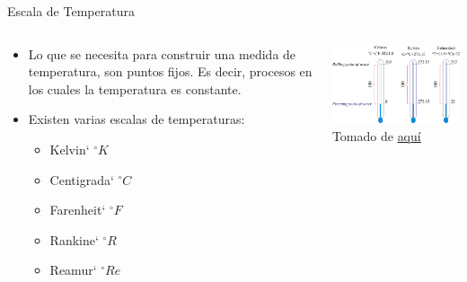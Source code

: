 \documentclass[aspectratio=169]{beamer}
\begin{document}
\begin{frame}{Escala de Temperatura}
    \begin{columns}[c, onlytextwidth]
        \begin{column}{0.50\textwidth}
            \begin{itemize}
                \item Lo que se necesita para construir una medida de temperatura, son puntos fijos. Es decir, procesos en los cuales la temperatura es constante.
                \item Existen varias escalas de temperaturas:
                \begin{itemize}
                    \item Kelvin` $ ^{\circ} K$
                    \item Centigrada` $ ^{\circ} C$
                    \item Farenheit` $ ^{\circ} F$
                    \item Rankine` $ ^{\circ} R$
                    \item Reamur` $ ^{\circ} Re$
                \end{itemize}
            \end{itemize}
        \end{column}
        \begin{column}{0.5\textwidth}
            \includegraphics[width=7cm]{fig/temperature_scales.png}
            \newline
            \tiny{Tomado de \href{https://glossary.periodni.com/dictionary.php?en=logaritamska+skala}{aquí}}
        \end{column}
    \end{columns}
\end{frame}
\end{document}
